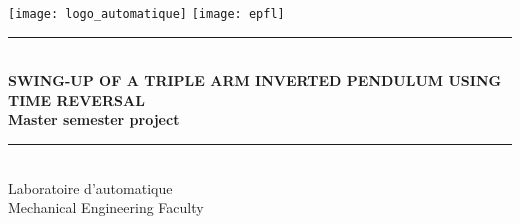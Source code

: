 \begin{titlepage}

\newcommand{\HRule}{\rule{\linewidth}{0.5mm}} %


\center %
\texttt{[image: logo\_automatique]}
\hfill
\texttt{[image: epfl]}\\[4.5cm]




\HRule \\[0.2cm]
\sffamily
{\LARGE\bfseries \uppercase{Swing-up of a triple arm inverted pendulum using time reversal}} \\[0.05cm]
{\Large\bfseries Master semester project}
\HRule \\[0.5cm]
 

{\Large Laboratoire d'automatique}\\[0.1cm] %
{\large Mechanical Engineering Faculty}\\[4.5cm] %


\end{titlepage}
